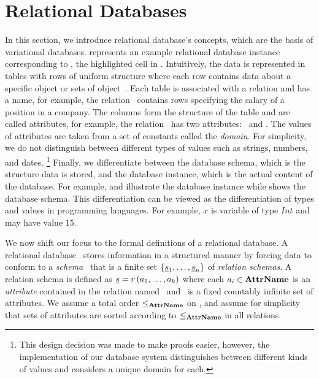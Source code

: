 \section{Relational Databases}
\label{sec:rdb}

In this section, we introduce relational database's concepts, which are the basis of variational databases. 
 represents an example relational
database instance corresponding to \vTwo, the highlighted cell in . 
%
Intuitively, the data is represented in tables with rows of uniform structure
where each row contains  data about a specific
object or sets of object~\cite{AliceBook}. Each table is 
associated with a relation and has a name, for example, 
the relation \job\ contains rows specifying the salary of a position in a company. 
The columns form the structure of the table and are called attributes,
for example, the relation \job\ has two attributes: \titleatt\ and \salary. 
The values of attributes are taken from a set of constants called the \emph{domain}. 
For simplicity, 
we do not distinguish between different types of values such as strings, numbers, and
dates.%
\footnote{This design decision was made to make proofs easier, however, the implementation of our
database system  distinguishes between different kinds of values
and considers a unique domain for each.}
%
Finally, we differentiate between the database schema, which is the structure 
data is stored, and the database instance, which is the actual content of the 
database. 
%
For example,  and  illustrate the database 
instance while  shows the database schema. 
%
This differentiation can be viewed as the differentiation of types and
values in programming languages. For example, $x$ is variable of type $\mathit{Int}$
and may have value $15$. 






We now shift our focus to the formal definitions of a relational database. 
A relational database \pDB\ stores information in a structured manner by forcing
data to conform to a \emph{schema} \pSch\ that is a finite set 
$\setDef {{\pRelSch}_1, \ldots, {\pRelSch}_n}$ of \emph{relation schemas}.
A relation schema is defined as
$\pRelSch = \vRel \paran {\vi \pAtt k}$ where each $\pAtt_i \in \pAttSet$ is an
\emph{attribute} contained in the relation named \vRel\ and \pAttSet\ is a 
fixed countably infinite set of 
attributes. %
%
We assume a total order $\leq_{\pAttSet}$ on \pAttSet, and assume for
simplicity that sets of attributes are sorted according
to $\leq_{\pAttSet}$ in all relations.
%

